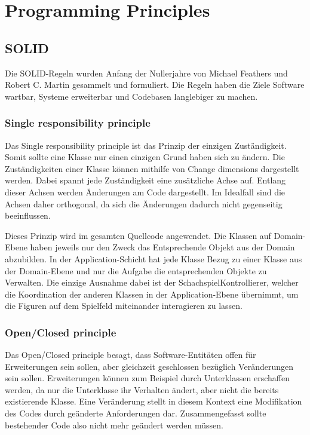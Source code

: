 \chapter{Programming Principles}

\section{SOLID}
Die SOLID-Regeln wurden Anfang der Nullerjahre von Michael Feathers und Robert C. Martin gesammelt und formuliert. Die Regeln haben die Ziele Software wartbar, Systeme erweiterbar und Codebasen langlebiger zu machen.

\subsection{Single responsibility principle}
Das Single responsibility principle ist das Prinzip der einzigen Zuständigkeit. Somit sollte eine Klasse nur einen einzigen Grund haben sich zu ändern. Die Zuständigkeiten einer Klasse können mithilfe von Change dimensions dargestellt werden. Dabei spannt jede Zuständigkeit eine zusätzliche Achse auf. Entlang dieser Achsen werden Änderungen am Code dargestellt. Im Idealfall sind die Achsen daher orthogonal, da sich die Änderungen dadurch nicht gegenseitig beeinflussen. 

Dieses Prinzip wird im gesamten Quellcode angewendet. Die Klassen auf Domain-Ebene haben jeweils nur den Zweck das Entsprechende Objekt aus der Domain abzubilden. In der Application-Schicht hat jede Klasse Bezug zu einer Klasse aus der Domain-Ebene und nur die Aufgabe die entsprechenden Objekte zu Verwalten. Die einzige Ausnahme dabei ist der SchachspielKontrollierer, welcher die Koordination der anderen Klassen in der Application-Ebene übernimmt, um die Figuren auf dem Spielfeld miteinander interagieren zu lassen.

\subsection{Open/Closed principle}
Das Open/Closed principle besagt, dass Software-Entitäten offen für Erweiterungen sein sollen, aber gleichzeit geschlossen bezüglich Veränderungen sein sollen. Erweiterungen können zum Beispiel durch Unterklassen erschaffen werden, da nur die Unterklasse ihr Verhalten ändert, aber nicht die bereits existierende Klasse. Eine Veränderung stellt in diesem Kontext eine Modifikation des Codes durch geänderte Anforderungen dar. Zusammengefasst sollte bestehender Code also nicht mehr geändert werden müssen.

